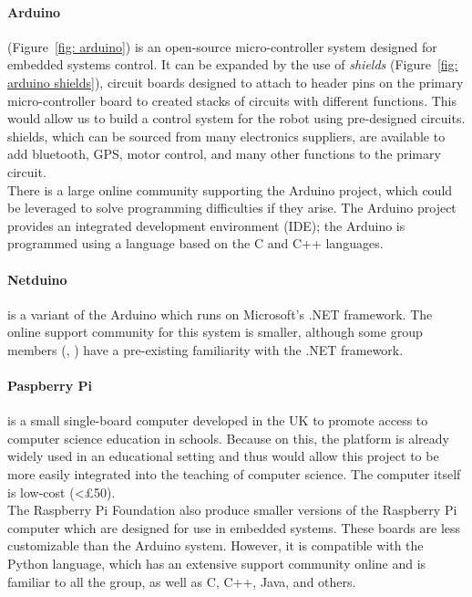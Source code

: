     \paragraph{Arduino} (Figure~\ref{fig: arduino}) is an open-source micro-controller system designed for embedded systems control. It can be expanded by the use of \emph{\glspl{shield}} (Figure~\ref{fig: arduino shields}), circuit boards designed to attach to header pins on the primary micro-controller board to created stacks of circuits with different functions. This would allow us to build a control system for the robot using pre-designed circuits. \Glspl{shield}, which can be sourced from many electronics suppliers, are available to add bluetooth, GPS, motor control, and many other functions to the primary circuit.\\
    There is a large online community supporting the Arduino project, which could be leveraged to solve programming difficulties if they arise. The Arduino project provides an integrated development environment (IDE); the Arduino is programmed using a language based on the C and C++ languages.
    \paragraph{Netduino} is a variant of the Arduino which runs on Microsoft's .NET framework. The online support community for this system is smaller, although some group members (\AG, \LY) have a pre-existing familiarity with the .NET framework.\\

    \paragraph{Paspberry Pi}is a small single-board computer developed in the UK to promote access to computer science education in schools. Because on this, the platform is already widely used in an educational setting and thus would allow this project to be more easily integrated into the teaching of computer science. The computer itself is low-cost (<\pounds{50}).\\
    The Raspberry Pi Foundation also produce smaller versions of the Raspberry Pi computer which are designed for use in embedded systems. These boards are less customizable than the Arduino system. However, it is compatible with the Python language, which has an extensive support community online and is familiar to all the group, as well as C, C++, Java, and others.

